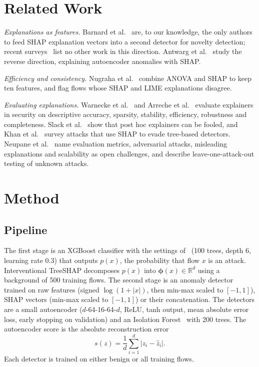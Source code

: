 \documentclass[conference]{IEEEtran}
\begin{document}
\section{Related Work}
\textit{Explanations as features.} Barnard et al.~\cite{barnard2022robust} are, to our knowledge, the only authors to feed SHAP explanation vectors into a second detector for novelty detection; recent surveys~\cite{neupane2022xids,khan2024xids} list no other work in this direction. Antwarg et al.~\cite{antwarg2021explaining} study the reverse direction, explaining autoencoder anomalies with SHAP.

\textit{Efficiency and consistency.} Nugraha et al.~\cite{nugraha2025versatile} combine ANOVA and SHAP to keep ten features, and flag flows whose SHAP and LIME explanations disagree.

\textit{Evaluating explanations.} Warnecke et al.~\cite{warnecke2020evaluating} and Arreche et al.~\cite{arreche2024exai} evaluate explainers in security on descriptive accuracy, sparsity, stability, efficiency, robustness and completeness. Slack et al.~\cite{slack2020fooling} show that post hoc explainers can be fooled, and Khan et al.~\cite{khan2024xids} survey attacks that use SHAP to evade tree-based detectors. Neupane et al.~\cite{neupane2022xids} name evaluation metrics, adversarial attacks, misleading explanations and scalability as open challenges, and describe leave-one-attack-out testing of unknown attacks.

\section{Method}
\subsection{Pipeline}
The first stage is an XGBoost classifier with the settings of~\cite{barnard2022robust} (100 trees, depth 6, learning rate 0.3) that outputs $p(x)$, the probability that flow $x$ is an attack. Interventional TreeSHAP decomposes $p(x)$ into $\boldsymbol{\phi}(x)\in\mathbb{R}^d$ using a background of 500 training flows. The second stage is an anomaly detector trained on raw features (signed $\log(1+|x|)$, then min-max scaled to $[-1,1]$), SHAP vectors (min-max scaled to $[-1,1]$) or their concatenation. The detectors are a small autoencoder ($d$-64-16-64-$d$, ReLU, tanh output, mean absolute error loss, early stopping on validation) and an Isolation Forest~\cite{liu2008iforest} with 200 trees. The autoencoder score is the absolute reconstruction error
\begin{equation}
s(z)=\frac{1}{d}\sum_{i=1}^{d}\left|z_i-\hat{z}_i\right|.\label{eq:are}
\end{equation}
Each detector is trained on either benign or all training flows.
\end{document}
